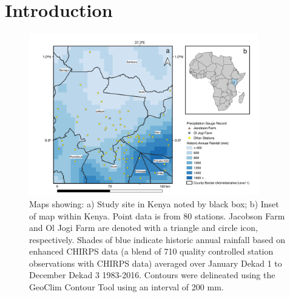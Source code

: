 \documentclass[draft]{agujournal2019}
\begin{document}

%
%
%
%

\section{Introduction}


\begin{figure}%
\centering
\includegraphics[width=100mm]{map.png}
\caption{Maps showing: a) Study site in Kenya noted by black box; b) Inset of map within Kenya. Point data is from 80 stations. Jacobson Farm and Ol Jogi Farm are denoted with a triangle and circle icon, respectively. Shades of blue indicate historic annual rainfall based on enhanced CHIRPS data (a blend of 710 quality controlled station observations with CHIRPS data) averaged over January Dekad 1 to December Dekad 3 1983-2016. Contours were delineated using the GeoClim Contour Tool using an interval of 200 mm.}
\label{fig:map}
\end{figure}
\end{document}
